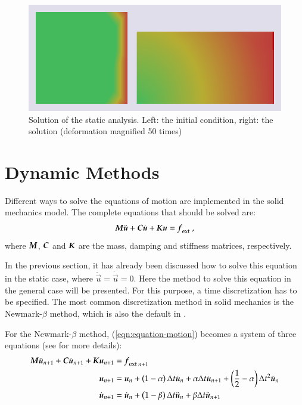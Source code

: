 \begin{figure}[!htb]
  \centering
  \includegraphics[width=.7\linewidth]{figures/static_analysis}
  \caption{Solution of the static analysis. Left: the initial
condition, right: the solution (deformation magnified 50 times)}
  \label{fig:smm:implicit:static_solution}
\end{figure}

\section{Dynamic Methods} \label{sect:smm:Dynamic_methods}

Different ways to solve the equations of motion are implemented in the
solid mechanics model.  The complete equations that should be solved
are:
\begin{equation}
\label{eqn:equation-motion}
\boldsymbol{M}\ddot{\boldsymbol{u}} +
\boldsymbol{C}\dot{\boldsymbol{u}} + \boldsymbol{K}\boldsymbol{u} = \boldsymbol{f}_{{\mathrm{ext}}}~,
\end{equation}
where $\boldsymbol{M}$, $\boldsymbol{C}$ and $\boldsymbol{K}$ are the mass,
damping and stiffness matrices, respectively.

In the previous section, it has already been discussed how to solve this
equation in the static case, where $\ddot{\vec{u}} = \dot{\vec{u}} = 0$.  Here
the method to solve this equation in the general case will be presented.  For
this purpose, a time discretization has to be specified.  The most common
discretization method in solid mechanics is the Newmark-$\beta$ method, which is
also the default in \akantu.

For the Newmark-$\beta$ method, (\ref{eqn:equation-motion}) becomes a
system of three equations (see \cite{curnier92a} \cite{hughes-83a} for
more details):
\begin{align}
\boldsymbol{M} \ddot{\boldsymbol{u}}_{n+1} + \boldsymbol{C}\dot{\boldsymbol{u}}_{n+1} + \boldsymbol{K} \boldsymbol{u}_{n+1} &={\boldsymbol{f}_{{\mathrm{ext}}}}_{\, n+1}
\label{eqn:equation-motion-discret} \\
\boldsymbol{u}_{n+1} &=\boldsymbol{u}_{n} + \left(1 - \alpha\right) \Delta t \dot{\boldsymbol{u}}_{n} +
\alpha \Delta t \dot{\boldsymbol{u}}_{n+1} + \left(\frac{1}{2} -
\alpha\right) \Delta t^2
\ddot{\boldsymbol{u}}_{n} \label{eqn:finite-difference-1}\\
\dot{\boldsymbol{u}}_{n+1} &= \dot{\boldsymbol{u}}_{n} + \left(1 - \beta\right)
\Delta t \ddot{\boldsymbol{u}}_{n} + \beta \Delta t
\ddot{\boldsymbol{u}}_{n+1} \label{eqn:finite-difference-2}
\end{align}

